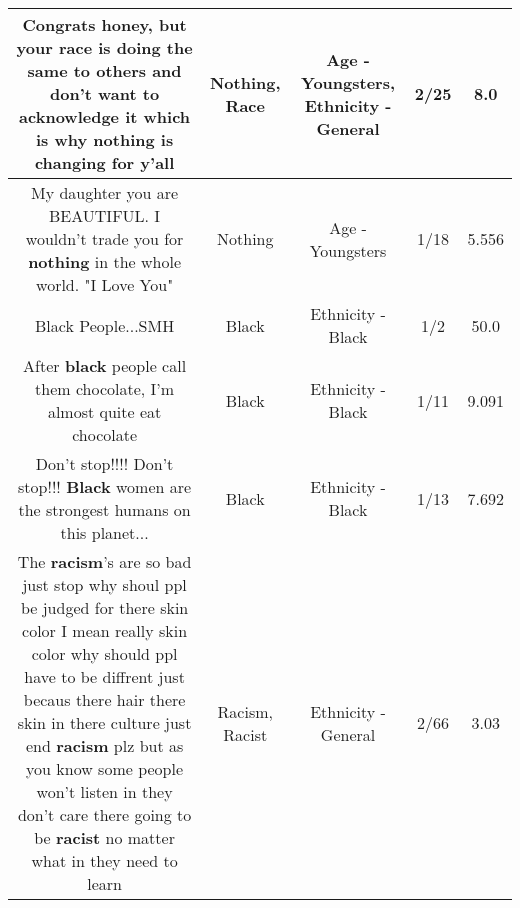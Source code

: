 \documentclass[11pt]{article}
\newlength\mylength
\begin{document}
\begin{center}
\begin{longtable}{|C{.65\mylength}|C{.30\mylength}|C{.12\mylength}|C{.12\mylength}|C{.12\mylength}|}
  \small Congrats honey, but your \textbf{race} is doing the same to others and don't want to acknowledge it which is why \textbf{nothing} is changing for y'all\normalsize   & Nothing, Race & Age - Youngsters, Ethnicity - General & 2/25 & 8.0 \\  \hline
  \small My daughter you are BEAUTIFUL. I wouldn't trade you for \textbf{nothing} in the whole world. "I Love You"\normalsize   & Nothing & Age - Youngsters & 1/18 & 5.556 \\  \hline
  \small Black People...SMH\normalsize   & Black & Ethnicity - Black & 1/2 & 50.0 \\  \hline
  \small After \textbf{black} people call them chocolate, I'm almost quite eat chocolate\normalsize   & Black & Ethnicity - Black & 1/11 & 9.091 \\  \hline
  \small Don't stop!!!! Don't stop!!! \textbf{Black} women are the strongest humans on this planet...\normalsize   & Black & Ethnicity - Black & 1/13 & 7.692 \\  \hline
  \small The \textbf{racism}'s are so bad just stop why shoul ppl be judged for there skin color I mean really skin color why should ppl have to be diffrent just becaus there hair there skin in there culture just end \textbf{racism} plz but as you know some people won't listen in they don't care there going to be \textbf{racist} no matter what in they need to learn\normalsize   & Racism, Racist & Ethnicity - General & 2/66 & 3.03 \\  \hline

\end{longtable}
\end{center}
\end{document}
